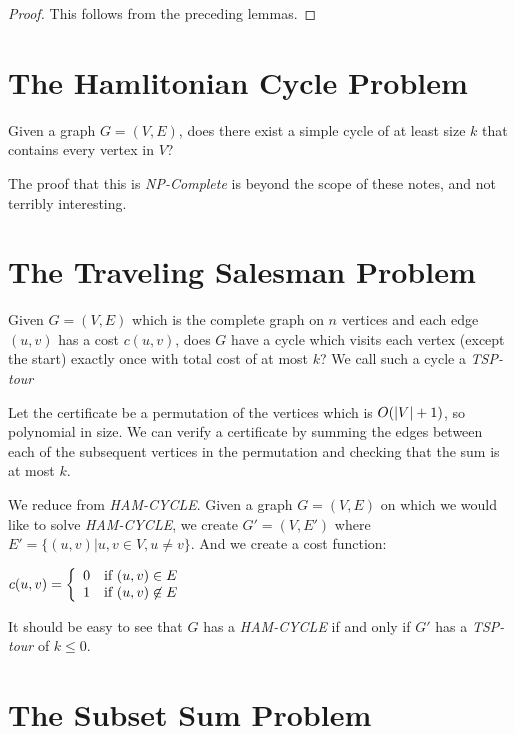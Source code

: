\begin{proof}
  This follows from the preceding lemmas.
\end{proof}

\section{The Hamlitonian Cycle Problem}

Given a graph $G=(V,E)$, does there exist a simple cycle of at least
size $k$ that contains every vertex in $V$?

The proof that this is \emph{NP-Complete} is beyond the scope of these
notes, and not terribly interesting.

\section{The Traveling Salesman Problem}

Given $G=(V,E)$ which is the complete graph on $n$ vertices and each
edge $(u,v)$ has a cost $c(u,v)$, does $G$ have a cycle which visits
each vertex (except the start) exactly once with total cost of at most
$k$?  We call such a cycle a \emph{TSP-tour}

Let the certificate be a permutation of the vertices which is
$O\!\left(|V| + 1\right)$, so polynomial in size.  We can verify a certificate
by summing the edges between each of the subsequent vertices in the
permutation and checking that the sum is at most $k$.

We reduce from \emph{HAM-CYCLE}.  Given a graph $G=(V,E)$ on which we
would like to solve \emph{HAM-CYCLE}, we create $G'=(V,E')$ where $E'
= \{ (u,v) | u,v \in V, u \neq v \}$.  And we create a cost function:

\begin{math}
  c(u,v) = \left\{ 
    \begin{array}{l l}
      0 & \text{if } (u,v) \in E \\
      1 & \text{if } (u,v) \not \in E \\
    \end{array} \right.
\end{math}

It should be easy to see that $G$ has a \emph{HAM-CYCLE} if and only
if $G'$ has a \emph{TSP-tour} of $k \leq 0$.

\section{The Subset Sum Problem}

